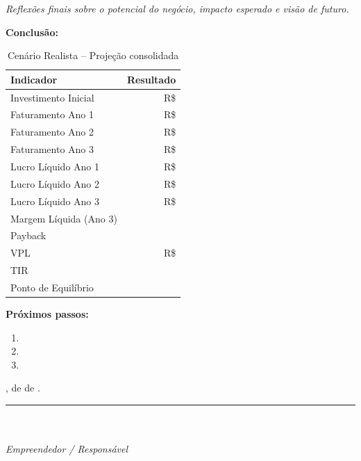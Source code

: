 \documentclass[
	12pt,
	openright,
	oneside,
	a4paper,
	chapter=TITLE,
	section=TITLE,
	english,
	brazil
	]{abntex2}
\newcommand{\campo}[2][6cm]{%
	\underline{\makebox[#1][l]{#2}}%
}
\newcommand{\icampo}{%
	\hrulefill
}
\newcommand{\tcampo}[1]{%
	{#1}%
}
\newcommand{\instrucao}[1]{%
	\vspace{0.3cm}%
	\noindent%
	{%
		\setlength{\fboxsep}{6pt}%
		\colorbox{azul-claro}{%
			\begin{minipage}{\dimexpr\textwidth-2\fboxsep\relax}%
				\setlength{\parindent}{1.25cm}%
				{\color{cinza-instrucao}\small\itshape #1}%
			\end{minipage}%
		}%
	}%
	\vspace{0.3cm}%
}
\begin{document}
\instrucao{Reflexões finais sobre o potencial do negócio, impacto esperado e visão de futuro.}

\vspace{0.5cm}

\noindent\textbf{Conclusão:}

\vspace{2cm}

\begin{table}[htbp]
\centering
\caption{Cenário Realista -- Projeção consolidada}
\label{tab:cenario-realista}
\centering
\begin{tabularx}{\textwidth}{X r}
\toprule
\rowcolor{azul-claro}
\textbf{Indicador} & \textbf{Resultado} \\
\midrule
Investimento Inicial & R\$ \tcampo{} \\
Faturamento Ano 1    & R\$ \tcampo{} \\
Faturamento Ano 2    & R\$ \tcampo{} \\
Faturamento Ano 3    & R\$ \tcampo{} \\
Lucro Líquido Ano 1  & R\$ \tcampo{} \\
Lucro Líquido Ano 2  & R\$ \tcampo{} \\
Lucro Líquido Ano 3  & R\$ \tcampo{} \\
Margem Líquida (Ano 3) & \tcampo{} \\
Payback              & \tcampo{} \\
VPL                  & R\$ \tcampo{} \\
TIR                  & \tcampo{} \\
Ponto de Equilíbrio  & \tcampo{} \\
\bottomrule
\end{tabularx}
\end{table}

\noindent\textbf{Próximos passos:}
\begin{enumerate}[itemsep=0.3cm]
	\item \icampo
	\item \icampo
	\item \icampo
\end{enumerate}

\vspace{1.5cm}

\begin{flushright}
	[Cidade], \underline{\hspace{4cm}} de \underline{\hspace{3cm}} de \underline{\hspace{2cm}}. \\[1.5cm]
	\rule{7cm}{0.4pt} \\[0.3cm]
	\textbf{\campo[7cm]{}} \\
	\textit{Empreendedor / Responsável}
\end{flushright}
\end{document}
